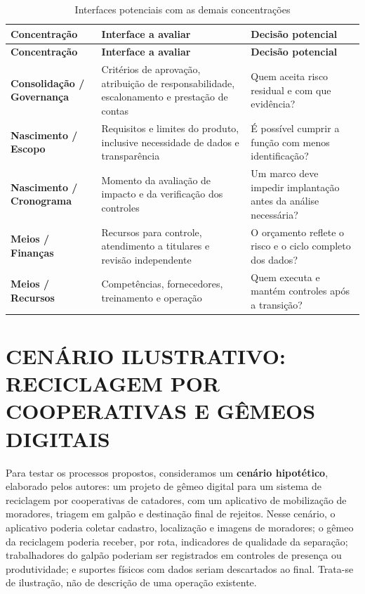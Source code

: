 \documentclass[12pt,a4paper,article,oneside,english,brazil]{abntex2}
\newcommand{\fontetab}[1]{\par\vspace{3pt}{\small\noindent Fonte: #1\par}}
\begin{document}
\begingroup\SingleSpacing\small
\begin{longtable}{@{}>{\raggedright\arraybackslash}p{}>{\raggedright\arraybackslash}p{}>{\raggedright\arraybackslash}p{}@{}}
\caption{Interfaces potenciais com as demais concentrações}\label{tab:t11}\\
\hline
\textbf{Concentração} & \textbf{Interface a avaliar} & \textbf{Decisão potencial}\\
\hline
\endfirsthead
\hline
\textbf{Concentração} & \textbf{Interface a avaliar} & \textbf{Decisão potencial}\\
\hline
\endhead
\hline
\endfoot
\hline
\endlastfoot
\textbf{Consolidação / Governança} & Critérios de aprovação, atribuição de responsabilidade, escalonamento e prestação de contas & Quem aceita risco residual e com que evidência?\\[3pt]
\textbf{Nascimento / Escopo} & Requisitos e limites do produto, inclusive necessidade de dados e transparência & É possível cumprir a função com menos identificação?\\[3pt]
\textbf{Nascimento / Cronograma} & Momento da avaliação de impacto e da verificação dos controles & Um marco deve impedir implantação antes da análise necessária?\\[3pt]
\textbf{Meios / Finanças} & Recursos para controle, atendimento a titulares e revisão independente & O orçamento reflete o risco e o ciclo completo dos dados?\\[3pt]
\textbf{Meios / Recursos} & Competências, fornecedores, treinamento e operação & Quem executa e mantém controles após a transição?\\[3pt]
\end{longtable}
\endgroup
\fontetab{Elaborado pelos autores (2026).}

\section{CENÁRIO ILUSTRATIVO: RECICLAGEM POR COOPERATIVAS E GÊMEOS DIGITAIS}

Para testar os processos propostos, consideramos um \textbf{cenário hipotético}, elaborado pelos autores: um projeto de gêmeo digital para um sistema de reciclagem por cooperativas de catadores, com um aplicativo de mobilização de moradores, triagem em galpão e destinação final de rejeitos. Nesse cenário, o aplicativo poderia coletar cadastro, localização e imagens de moradores; o gêmeo da reciclagem poderia receber, por rota, indicadores de qualidade da separação; trabalhadores do galpão poderiam ser registrados em controles de presença ou produtividade; e suportes físicos com dados seriam descartados ao final. Trata-se de ilustração, não de descrição de uma operação existente.
\end{document}
